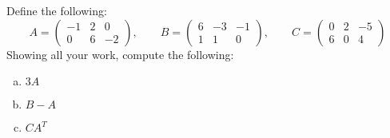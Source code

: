 \documentclass[11pt,letterpaper]{article}
\begin{document}
\newpage



 Define the following:
	\[
	A= \begin{pmatrix} -1 & 2 & 0 \\ 0 & 6 & -2 \end{pmatrix}, \qquad
	B= \begin{pmatrix} 6 & -3 & -1 \\ 1 & 1 & 0 \end{pmatrix}, \qquad
	C= \begin{pmatrix} 0 & 2 & -5 \\ 6 & 0 & 4 \end{pmatrix}
	\]
Showing all your work, compute the following:
	\begin{enumerate}[(a)]
	\item $3A$
	\item $B - A$
	\item $CA^T$
	\end{enumerate} \pspace
\end{document}

